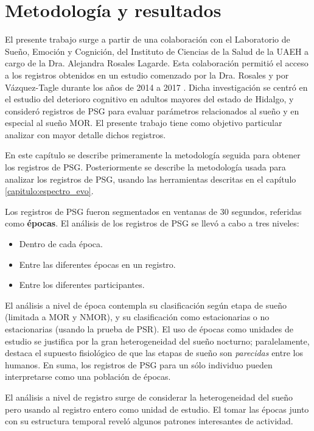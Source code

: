 \documentclass[12pt,letterpaper]{book}
\begin{document}
\chapter{Metodología y resultados}
\label{ch:metodologia}

El presente trabajo surge a partir de una colaboración con el Laboratorio de Sueño, Emoción y Cognición, del Instituto de Ciencias de la Salud de la UAEH a cargo de la Dra. Alejandra Rosales Lagarde.
%
Esta colaboración permitió el acceso a los registros obtenidos en un estudio comenzado por la Dra. Rosales y por Vázquez-Tagle durante los años de 2014 a 2017 \cite{VazquezTagle16}. 
%
Dicha investigación se centró en el estudio del deterioro cognitivo en adultos mayores del estado de Hidalgo, y consideró registros de PSG para evaluar parámetros relacionados al sueño y en especial al sueño MOR.
%
El presente trabajo tiene como objetivo particular analizar con mayor detalle dichos registros.

En este capítulo se describe primeramente la metodología seguida para obtener los registros de PSG.
%
Posteriormente se describe la metodología usada para analizar los registros de PSG, usando las herramientas descritas en el capítulo \ref{capitulo:espectro_evo}.

Los registros de PSG fueron segmentados en ventanas de 30 segundos, referidas como \textbf{épocas}.
%
El análisis de los registros de PSG se llevó a cabo a tres niveles:
\begin{itemize}
\item Dentro de cada época.
\item Entre las diferentes épocas en un registro.
\item Entre los diferentes participantes.
\end{itemize}

El análisis a nivel de época contempla su clasificación según etapa de sueño (limitada a MOR y NMOR), y su clasificación como estacionarias o no estacionarias (usando la prueba de PSR).
%
El uso de épocas como unidades de estudio se justifica por la gran heterogeneidad del sueño nocturno; paralelamente, destaca el supuesto fisiológico de que las etapas de sueño son \textit{parecidas} entre los humanos.
%
En suma, los registros de PSG para un sólo individuo pueden interpretarse como una población de épocas.

El análisis a nivel de registro surge de considerar la heterogeneidad del sueño pero usando al registro entero como unidad de estudio.
%
El tomar las épocas junto con su estructura temporal reveló algunos patrones interesantes de actividad.
\end{document}
